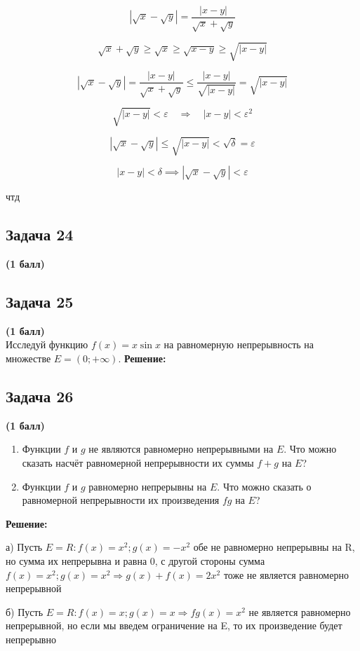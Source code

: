 \documentclass[a4paper,12pt]{article}
\begin{document}
\[
|\sqrt{x} - \sqrt{y}| = \frac{|x - y|}{\sqrt{x} + \sqrt{y}}
\]

\[
\sqrt{x} + \sqrt{y} \geq \sqrt{x} \geq \sqrt{x - y} \geq \sqrt{|x - y|}
\]

\[
|\sqrt{x} - \sqrt{y}| = \frac{|x - y|}{\sqrt{x} + \sqrt{y}} \leq \frac{|x - y|}{\sqrt{|x - y|}} = \sqrt{|x - y|}
\]

\[
\sqrt{|x - y|} < \varepsilon \quad \Rightarrow \quad |x - y| < \varepsilon^2
\]

\[
|\sqrt{x} - \sqrt{y}| \leq \sqrt{|x - y|} < \sqrt{\delta} = \varepsilon
\]

\[
|x - y| < \delta \implies |\sqrt{x} - \sqrt{y}| < \varepsilon
\]

чтд


\subsection{Задача 24}
\textbf{(1 балл)} \\

\subsection{Задача 25}
\textbf{(1 балл)} \\
Исследуй функцию $f(x) = x \sin x$ на равномерную непрерывность на множестве $E = (0; +\infty)$.
\textbf{Решение:}

\subsection{Задача 26}
\textbf{(1 балл)} \\
\begin{enumerate}[label=\alph*)]
    \item Функции $f$ и $g$ не являются равномерно непрерывными на $E$. Что можно сказать насчёт равномерной непрерывности их суммы $f + g$ на $E$?
    \item Функции $f$ и $g$ равномерно непрерывны на $E$. Что можно сказать о равномерной непрерывности их произведения $fg$ на $E$?
\end{enumerate}
\textbf{Решение:}

а) Пусть $E = R: f(x)=x^2; g(x) = -x^2$ обе не равномерно непрерывны на R, но сумма их непрерывна и равна 0, с другой стороны сумма $f(x)=x^2; g(x)=x^2 \Rightarrow g(x)+f(x)=2x^2$ тоже не является равномерно непрерывной

б) Пусть $E = R: f(x)=x; g(x)=x \Rightarrow fg(x) = x^2$ не является равномерно непрерывной, но если мы введем ограничение на E, то их произведение будет непрерывно 
\end{document}
